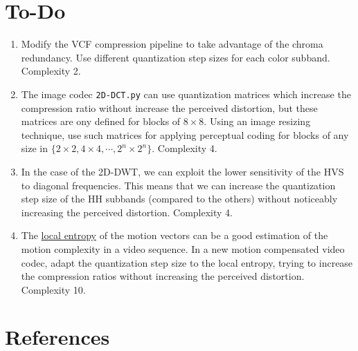 \section{To-Do}
\begin{enumerate}
\item Modify the VCF compression pipeline to take advantage of the chroma
  redundancy. Use different quantization step sizes for each color
  subband. Complexity 2.
\item The image codec \texttt{2D-DCT.py} can use quantization matrices
  which increase the compression ratio without increase the perceived
  distortion, but these matrices are ony defined for blocks of
  $8\times 8$. Using an image resizing technique, use such matrices
  for applying perceptual coding for blocks of any size in
  $\{2\times 2, 4\times 4, \cdots, 2^n\times 2^n\}$. Complexity 4.
\item In the case of the 2D-DWT, we can exploit the lower sensitivity
  of the HVS to diagonal frequencies. This means that we can increase
  the quantization step size of the HH subbands (compared to the
  others) without noticeably increasing the perceived
  distortion. Complexity 4.
\item The
  \href{https://scikit-image.org/docs/stable/auto_examples/filters/plot_entropy.html}{local
    entropy} of the motion vectors can be a good estimation of the
  motion complexity in a video sequence. In a new motion compensated
  video codec, adapt the quantization step size to the local entropy,
  trying to increase the compression ratios without increasing the
  perceived distortion. Complexity 10.
\end{enumerate}

\section{References}

\renewcommand{\addcontentsline}[3]{}%

